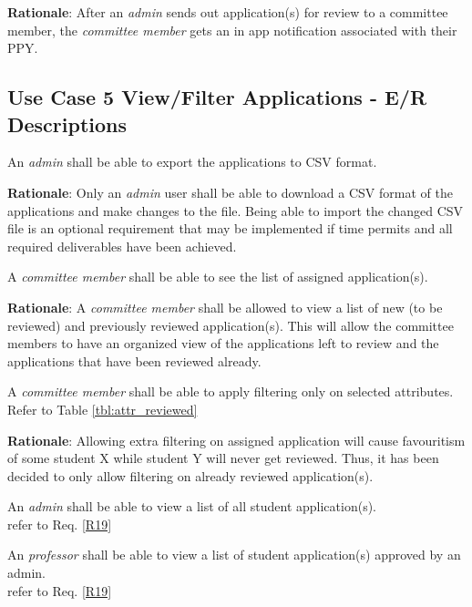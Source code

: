 \documentclass[fontsize=12pt,paper=letter,twoside]{scrartcl}
\begin{document}
\smallskip
\noindent \textbf{Rationale}: After an \emph{admin} sends out application(s) for review to a committee member, the \emph{committee member} gets an in app notification associated with their PPY.

\subsection{Use Case 5 View/Filter Applications - E/R Descriptions}

\genreq
{An \emph{admin} shall be able to export the applications to CSV format.\\}
{}
\label{R14}

\smallskip
\noindent \textbf{Rationale}: Only an \emph{admin} user shall be able to download a CSV format of the applications and make changes to the file. Being able to import the changed CSV file is an optional requirement that may be implemented if time permits and all required deliverables have been achieved.

\genreq
{A \emph{committee member} shall be able to see the list of assigned application(s).\\}
{}
\label{R15}

\smallskip
\noindent \textbf{Rationale}: A \emph{committee member} shall be allowed to view a list of new (to be reviewed) and previously reviewed application(s). This will allow the committee members to have an organized view of the applications left to review and the applications that have been reviewed already.

\rdescription
{A \emph{committee member} shall be able to apply filtering only on selected attributes.\\}
{Refer to Table \ref{tbl:attr_reviewed}}
\label{R16}

\smallskip
\noindent \textbf{Rationale}: Allowing extra filtering on assigned application will cause favouritism of some student X while student Y will never get reviewed. Thus, it has been decided to only allow filtering on already reviewed application(s).

\rdescription
{An \emph{admin} shall be able to view a list of all student application(s).\\}
{refer to Req. \ref{R19}}
\label{R17}

\rdescription
{An \emph{professor} shall be able to view a list of student application(s) approved by an admin.\\}
{refer to Req. \ref{R19}}
\label{R18}
\end{document}
